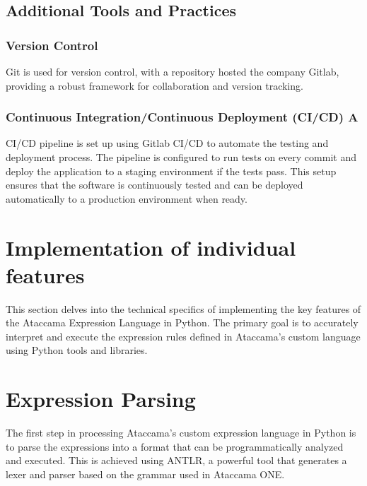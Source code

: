 \subsection{Additional Tools and Practices}

\subsubsection{Version Control}

Git is used for version control, with a repository hosted the company Gitlab, providing a robust framework for collaboration and version tracking.

\subsubsection{Continuous Integration/Continuous Deployment (CI/CD) A}

CI/CD pipeline is set up using Gitlab CI/CD to automate the testing and deployment process. The pipeline is configured to run tests on every commit and deploy the application to a staging environment if the tests pass. This setup ensures that the software is continuously tested and can be deployed automatically to a production environment when ready.


\section{Implementation of individual features}

This section delves into the technical specifics of implementing the key features of the Ataccama Expression Language in Python. The primary goal is to accurately interpret and execute the expression rules defined in Ataccama's custom language using Python tools and libraries.

\section{Expression Parsing}

The first step in processing Ataccama’s custom expression language in Python is to parse the expressions into a format that can be programmatically analyzed and executed. This is achieved using ANTLR, a powerful tool that generates a lexer and parser based on the grammar used in Ataccama ONE.

